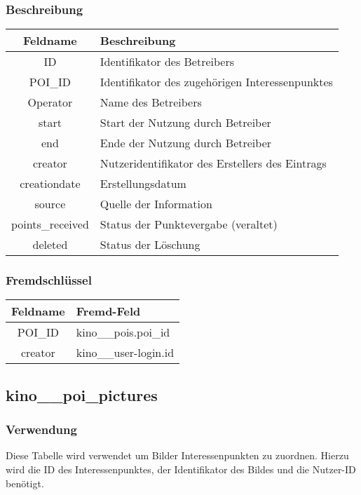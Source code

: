 \subsubsection{Beschreibung}
\begin{table}[H]
	\begin{tabular}{|c|p{12cm}|}
		\hline
		\textbf{Feldname} & \textbf{Beschreibung} \\ \hline
		ID & Identifikator des Betreibers \\ \hline
		POI\_ID & Identifikator des zugehörigen Interessenpunktes \\ \hline
		Operator & Name des Betreibers \\ \hline
		start & Start der Nutzung durch Betreiber \\ \hline
		end & Ende der Nutzung durch Betreiber \\ \hline
		creator & Nutzeridentifikator des Erstellers des Eintrags \\ \hline
		creationdate & Erstellungsdatum \\ \hline
		source & Quelle der Information \\ \hline
		points\_received & Status der Punktevergabe (veraltet) \\ \hline
		deleted & Status der Löschung \\ \hline
	\end{tabular}
\end{table}
\subsubsection{Fremdschlüssel}
\begin{table}[H]
	\begin{tabular}{|c|p{12.5cm}|}
		\hline
		\textbf{Feldname} & \textbf{Fremd-Feld} \\ \hline
		POI\_ID & kino\_\_pois.poi\_id \\ \hline
		creator & kino\_\_user-login.id \\ \hline
	\end{tabular}
\end{table}
\subsection{kino\_\_poi\_pictures}
\subsubsection{Verwendung} Diese Tabelle wird verwendet um Bilder Interessenpunkten zu zuordnen. Hierzu wird die ID des Interessenpunktes, der Identifikator des Bildes und die Nutzer-ID benötigt.
